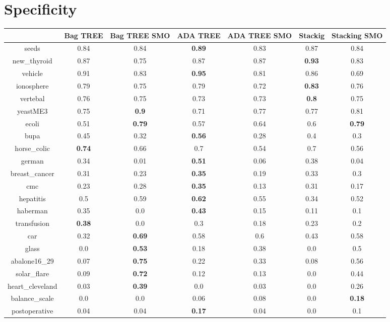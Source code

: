 \documentclass{article}%
\begin{document}
\section*{Specificity}%
\begin{tabular}{c|cccccc}%
&Bag TREE&Bag TREE SMO&ADA TREE&ADA TREE SMO&Stackig&Stacking SMO\\%
\hline%
seeds&0.84&0.84&\textbf{0.89}&0.83&0.87&0.84\\%
new\_thyroid&0.87&0.75&0.87&0.87&\textbf{0.93}&0.83\\%
vehicle&0.91&0.83&\textbf{0.95}&0.81&0.86&0.69\\%
ionosphere&0.79&0.75&0.79&0.72&\textbf{0.83}&0.76\\%
vertebal&0.76&0.75&0.73&0.73&\textbf{0.8}&0.75\\%
yeastME3&0.75&\textbf{0.9}&0.71&0.77&0.77&0.81\\%
ecoli&0.51&\textbf{0.79}&0.57&0.64&0.6&\textbf{0.79}\\%
bupa&0.45&0.32&\textbf{0.56}&0.28&0.4&0.3\\%
horse\_colic&\textbf{0.74}&0.66&0.7&0.54&0.7&0.56\\%
german&0.34&0.01&\textbf{0.51}&0.06&0.38&0.04\\%
breast\_cancer&0.31&0.23&\textbf{0.35}&0.19&0.33&0.3\\%
cmc&0.23&0.28&\textbf{0.35}&0.13&0.31&0.17\\%
hepatitis&0.5&0.59&\textbf{0.62}&0.55&0.34&0.52\\%
haberman&0.35&0.0&\textbf{0.43}&0.15&0.11&0.1\\%
transfusion&\textbf{0.38}&0.0&0.3&0.18&0.23&0.2\\%
car&0.32&\textbf{0.69}&0.58&0.6&0.43&0.58\\%
glass&0.0&\textbf{0.53}&0.18&0.38&0.0&0.5\\%
abalone16\_29&0.07&\textbf{0.75}&0.22&0.33&0.08&0.56\\%
solar\_flare&0.09&\textbf{0.72}&0.12&0.13&0.0&0.44\\%
heart\_cleveland&0.03&\textbf{0.39}&0.0&0.03&0.0&0.26\\%
balance\_scale&0.0&0.0&0.06&0.08&0.0&\textbf{0.18}\\%
postoperative&0.04&0.04&\textbf{0.17}&0.04&0.0&0.1\\%
\end{tabular}

%
\end{document}
